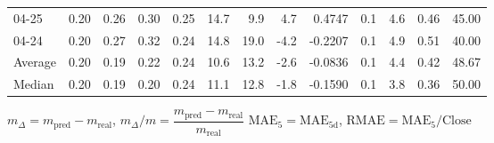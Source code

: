 \begin{threeparttable}
{\begin{tabular}{lrrrrrrrrrrrr}
  04-25 &          0.20 &          0.26 &          0.30 &        0.25 &                14.7 &                 9.9 &        4.7 &       0.4747 &                 0.1 &              4.6 &            0.46 &                  45.00 \\
  04-24 &          0.20 &          0.27 &          0.32 &        0.24 &                14.8 &                19.0 &       -4.2 &      -0.2207 &                 0.1 &              4.9 &            0.51 &                  40.00 \\
Average &          0.20 &          0.19 &          0.22 &        0.24 &                10.6 &                13.2 &       -2.6 &      -0.0836 &                 0.1 &              4.4 &            0.42 &                  48.67 \\
 Median &          0.20 &          0.19 &          0.20 &        0.24 &                11.1 &                12.8 &       -1.8 &      -0.1590 &                 0.1 &              3.8 &            0.36 &                  50.00 \\
\bottomrule
\end{tabular}
}
\begin{tablenotes}\footnotesize
\item $m_\Delta=m_{\text{pred}}-m_{\text{real}}$,
$m_\Delta/m=\dfrac{m_{\text{pred}}-m_{\text{real}}}{m_{\text{real}}}$
$\mathrm{MAE}_5=\mathrm{MAE}_{5\text{d}}$,
$\mathrm{RMAE}=\mathrm{MAE}_5/\text{Close}$
\end{tablenotes}
\end{threeparttable}
\endgroup

